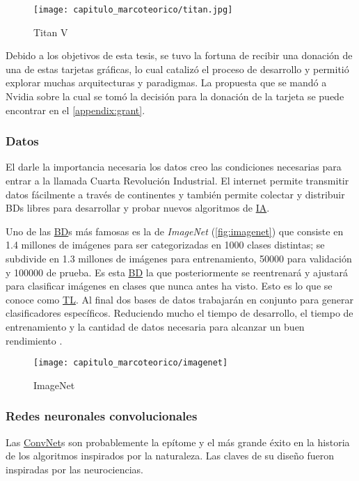 \begin{figure}[H]
    \centering
    \texttt{[image: capitulo\_marcoteorico/titan.jpg]}
    \caption{Titan V}\label{fig:titan}
\end{figure}

Debido a los objetivos de esta tesis, se tuvo la fortuna de recibir una donación
de una de estas tarjetas gráficas, lo cual catalizó el proceso de desarrollo y
permitió explorar muchas arquitecturas y paradigmas. La propuesta que se mandó a
Nvidia sobre la cual se tomó la decisión para la donación de la tarjeta se puede
encontrar en el \autoref{appendix:grant}.

\subsubsection{Datos}

El darle la importancia necesaria los datos creo las condiciones necesarias para
entrar a la llamada Cuarta Revolución Industrial. El internet permite transmitir
datos fácilmente a través de continentes y también permite colectar y distribuir
BDs libres para desarrollar y probar nuevos algoritmos de \hyperlink{abbr}{IA}. 

Uno de las \hyperlink{abbr}{BD}s más famosas es la de \emph{ImageNet}
(\autoref{fig:imagenet}) que consiste en 1.4 millones de imágenes para ser
categorizadas en 1000 clases distintas; se subdivide en 1.3 millones de imágenes
para entrenamiento, 50000 para validación y 100000 de prueba. Es esta
\hyperlink{abbr}{BD} la que posteriormente se reentrenará y ajustará para
clasificar imágenes en clases que nunca antes ha visto. Esto es lo que se conoce
como \hyperlink{abbr}{TL}. Al final dos bases de datos trabajarán en conjunto
para generar clasificadores específicos. Reduciendo mucho el tiempo de
desarrollo, el tiempo de entrenamiento y la cantidad de datos necesaria para
alcanzar un buen rendimiento \cite{Russakovsky2015}.

\begin{figure}[H]
    \centering
    \texttt{[image: capitulo\_marcoteorico/imagenet]}
    \caption{ImageNet}\label{fig:imagenet}
\end{figure}


\subsubsection{Redes neuronales convolucionales}

Las \hyperlink{abbr}{ConvNet}s son probablemente la epítome y el más grande éxito
en la historia de los algoritmos inspirados por la naturaleza. Las claves de su
diseño fueron inspiradas por las neurociencias.


